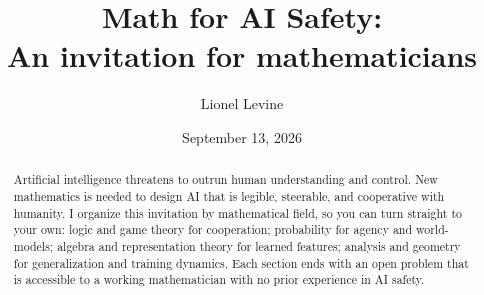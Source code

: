 \documentclass[11pt,reqno]{amsart}
\title[Math for AI Safety]{Math for AI Safety: \\ An invitation for mathematicians}
\author{Lionel Levine}
\date{September 13, 2026}
\theoremstyle{plain}
\theoremstyle{maisopenproblem}
\begin{document}
\begin{abstract}
Artificial intelligence threatens to outrun human understanding and control. New mathematics is needed to design AI that is legible, steerable, and cooperative with humanity. I organize this invitation by mathematical field, so you can turn straight to your own: logic and game theory for cooperation; probability for agency and world-models; algebra and representation theory for learned features; analysis and geometry for generalization and training dynamics. Each section ends with an open problem that is accessible to a working mathematician with no prior experience in AI safety.
\end{abstract}

\maketitle






%
%

\end{document}
